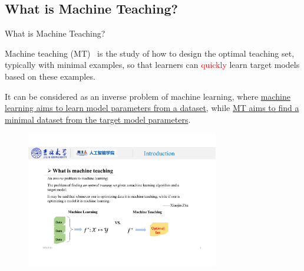 \documentclass[aspectratio=169,xcolor=dvipsnames]{beamer}
\begin{document}
\subsection{What is Machine Teaching?}
\begin{frame}{What is Machine Teaching?}
\vspace{-2mm}

\justify
Machine teaching (MT)~\cite{zhu2015machine, zhu2018overview} is the study of how to design the \alert{optimal teaching set}, typically with \alert{minimal} examples, so that learners can \textcolor{red}{quickly} learn \alert{target models} based on these examples.
\vspace{1mm}

\justify
It can be considered as an \alert{inverse problem} of machine learning, where \uline{machine learning aims to learn model parameters from a dataset}, while \uline{MT aims to find a minimal dataset from the target model parameters}.


\begin{figure}
  \centering
  \includegraphics[width=0.75\textwidth]{Source/MLvsMT.pdf}
\end{figure}

\end{frame}
\end{document}
